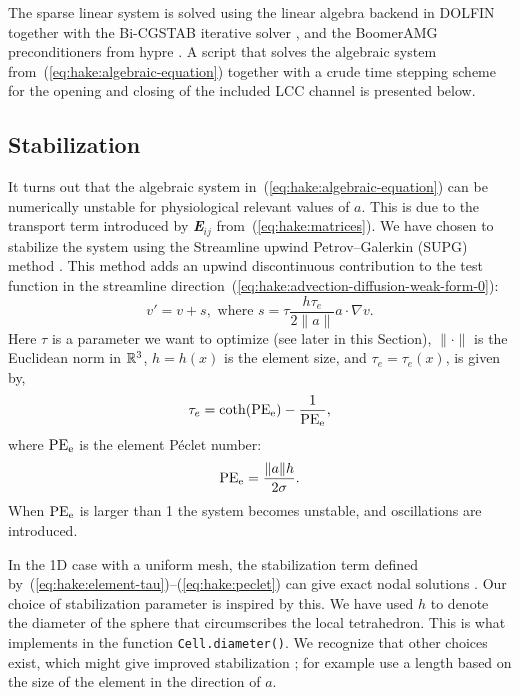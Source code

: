 The sparse linear system is solved using the \petsc linear algebra
backend \citep{BalayBuschelmanGroppEtAl2001} in DOLFIN together with
the Bi-CGSTAB iterative solver \citep{Vorst1992}, and the BoomerAMG
preconditioners from hypre \citep{FalgoutYang2002}. A script that
solves the algebraic system from~(\ref{eq:hake:algebraic-equation})
together with a crude time stepping scheme for the opening and closing
of the included LCC channel is presented below.

\subsection{Stabilization}
\label{sec:hake:stabilization}

It turns out that the algebraic system
in~(\ref{eq:hake:algebraic-equation}) can be numerically unstable for
physiological relevant values of $a$. This is due to the transport
term introduced by {\bfseries\itshape E}$_{ij}$
from~(\ref{eq:hake:matrices}). We have chosen to stabilize the system
using the Streamline upwind Petrov--Galerkin (SUPG) method
\citep{BrooksHughes1982}. This method adds an upwind discontinuous
contribution to the test function in the streamline
direction~(\ref{eq:hake:advection-diffusion-weak-form-0}):
\begin{equation}
  \label{eq:hake:stabilizing-term}
  v' = v+s, \text{ where } s = \tau\frac{h\tau_e}{2\|a\|}a\cdot\nabla v.
\end{equation}
Here $\tau$ is a parameter we want to optimize (see later in this
Section), $\|\cdot\|$ is the Euclidean norm in $\mathbb{R}^3$, $h=h(x)$ is
the element size, and $\tau_e=\tau_e(x)$, is given by,
\begin{equation}
  \label{eq:hake:element-tau}
  \tau_e=\coth(\mathrm{PE}_{\mathrm{e}})-\frac{1}{\mathrm{PE}_{\mathrm{e}}},
\end{equation}
where $\mathrm{PE}_{\mathrm{e}}$ is the element P\'eclet number:
\begin{equation}
  \label{eq:hake:peclet}
  \mathrm{PE}_{\mathrm{e}} = \frac{\|a\|h}{2\sigma}.
\end{equation}
When $\mathrm{PE}_{\mathrm{e}}$ is larger than 1 the system becomes unstable, and
oscillations are introduced.

In the 1D case with a uniform mesh, the stabilization term defined
by~(\ref{eq:hake:element-tau})--(\ref{eq:hake:peclet}) can give exact
nodal solutions
\citep{ChristieGriffithsMitchellEtAl1976,BrooksHughes1982}. Our choice
of stabilization parameter is inspired by this.  We have used $h$ to
denote the diameter of the sphere that circumscribes the local
tetrahedron.  This is what \dolfin implements in the function
\texttt{Cell.diameter()}. We recognize that other choices exist, which
might give improved stabilization \citep{JohnKnobloch2007}; for
example \citet{TezduyarPark1986} use a length based on the size of the
element in the direction of $a$.


